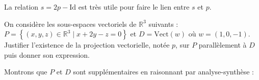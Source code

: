 \documentclass[french,11pt,twoside]{VcCours}
\begin{document}
\begin{Remarque}{} 
	La relation $s=2p-\textrm{Id}$ est très utile pour faire le lien entre $s$ et $p$.
\end{Remarque}


\begin{Exemple} On considère les sous-espaces vectoriels de $\mathbb{R}^3 $ suivants : $P = \left\{ {(x,y,z) \in \mathbb{R}^3 \mid x + 2y - z = 0} \right\}$ et $D = \textrm{Vect} (w){\text{ o\`u }}w = (1,0, - 1)$. Justifier l'existence de la projection vectorielle, notée $p$, sur $P$ parallèlement à $D$ puis donner son expression.

\medskip

%

Montrons que $P$ et $D$ sont supplémentaires en raisonnant par analyse-synthèse :

%
%
%
%
\newpage

\vspace*{8cm}
\end{Exemple}
\end{document}
